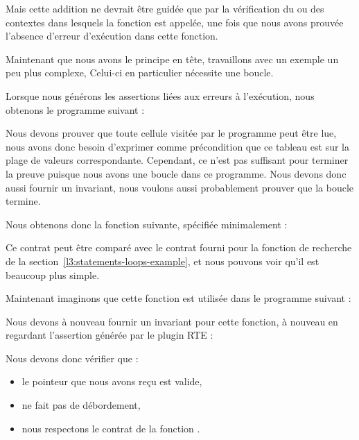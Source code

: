 

Mais cette addition ne devrait être guidée que par la vérification du ou des
contextes dans lesquels la fonction est appelée, une fois que nous avons
prouvée l'absence d'erreur d'exécution dans cette fonction.




Maintenant que nous avons le principe en tête, travaillons avec un exemple un peu
plus complexe, Celui-ci en particulier nécessite une boucle.




Lorsque nous générons les assertions liées aux erreurs à l'exécution, nous
obtenons le programme suivant :




Nous devons prouver que toute cellule visitée par le programme peut être lue,
nous avons donc besoin d'exprimer comme précondition que ce tableau est
 sur la plage de valeurs correspondante.
Cependant, ce n'est pas suffisant pour terminer la preuve puisque nous avons une
boucle dans ce programme. Nous devons donc aussi fournir un invariant, nous
voulons aussi probablement prouver que la boucle termine.


Nous obtenons donc la fonction suivante, spécifiée minimalement :





Ce contrat peut être comparé avec le contrat fourni pour la fonction de recherche
de la section~\ref{l3:statements-loops-example}, et nous pouvons voir qu'il est
beaucoup plus simple.


Maintenant imaginons que cette fonction est utilisée dans le programme suivant :




Nous devons à nouveau fournir un invariant pour cette fonction, à nouveau en
regardant l'assertion générée par le plugin RTE :




Nous devons donc vérifier que :

\begin{itemize}
\item le pointeur que nous avons reçu est valide,
\item {} ne fait pas de débordement,
\item nous respectons le contrat de la fonction .
\end{itemize}


